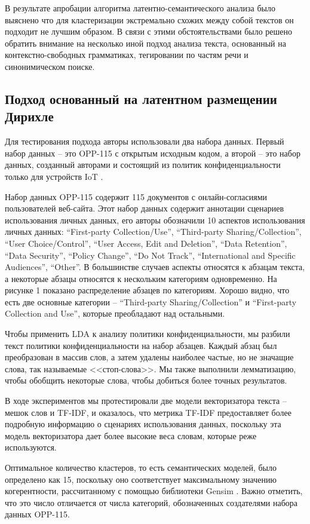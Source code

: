 \documentclass[../main]{subfiles}
\begin{document}
В результате апробации алгоритма латентно-семантического анализа было выяснено что для кластеризации экстремально схожих между собой текстов он  подходит не лучшим образом. В связи с этими обстоятельствами было решено обратить внимание на несколько иной подход анализа текста, основанный на контекстно-свободных грамматиках, тегировании по частям речи и синонимическом поиске.

\subsection{Подход основанный на латентном размещении Дирихле}
Для тестирования подхода авторы использовали два набора данных. Первый набор данных – это OPP-115 с открытым исходным кодом, а второй – это набор данных, созданный авторами и состоящий из политик конфиденциальности только для устройств IoT \cite{MDPI12}.

Набор данных OPP-115 содержит 115 документов с онлайн-согласиями пользователей веб-сайта. Этот набор данных содержит аннотации сценариев использования личных данных, его авторы обозначили 10 аспектов использования личных данных: “First-party Collection/Use”, “Third-party Sharing/Col\-lec\-ti\-on”, “User Choice/Control”, “User Access, Edit and Deletion”, “Data Re\-ten\-ti\-on”, “Data Security”, “Policy Change”, “Do Not Track”, “International and Specific Audiences”, “Other”. В большинстве случаев аспекты относятся к абзацам текста, а некоторые абзацы относятся к нескольким категориям одновременно. На рисунке 1 показано распределение абзацев по категориям. Хорошо видно, что есть две основные категории – “Third-party Sharing/Collection” и “First-party Collection and Use”, которые преобладают над остальными.

Чтобы применить LDA к анализу политики конфиденциальности, мы разбили текст политики конфиденциальности на набор абзацев. Каждый абзац был преобразован в массив слов, а затем удалены наиболее частые, но не значащие слова, так называемые <<стоп-слова>>. Мы также выполнили лемматизацию, чтобы обобщить некоторые слова, чтобы добиться более точных результатов.

В ходе экспериментов мы протестировали две модели векторизатора текста – мешок слов и TF-IDF, и оказалось, что метрика TF-IDF предоставляет более подробную информацию о сценариях использования данных, поскольку эта модель векторизатора дает более высокие веса словам, которые реже используются.

Оптимальное количество кластеров, то есть семантических моделей, было определено как 15, поскольку оно соответствует максимальному значению когерентности, рассчитанному с помощью библиотеки Gensim \cite{MDPI13}. Важно отметить, что это число отличается от числа категорий, обозначенных создателями набора данных OPP-115.
\end{document}
